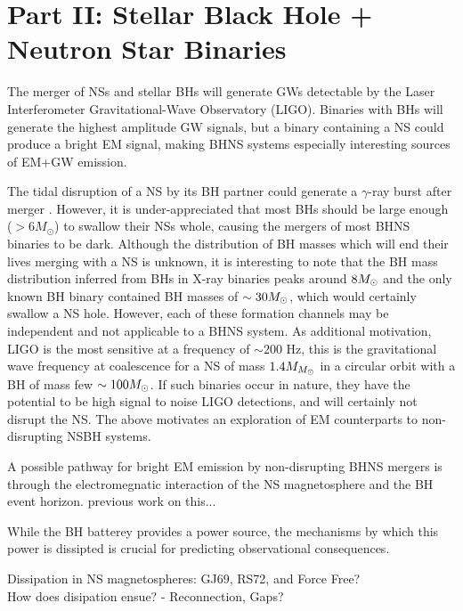 \section{Part II: Stellar Black Hole + Neutron Star Binaries}
%

The merger of NSs and stellar BHs will generate GWs detectable by the Laser
Interferometer Gravitational-Wave Observatory (LIGO). Binaries with BHs will
generate the highest amplitude GW signals, but a binary containing a NS could
produce a bright EM signal, making BHNS systems especially interesting sources
of EM+GW emission.

The tidal disruption of a NS by its BH partner could generate a $\gamma$-ray
burst after merger \citep{NPP:NSBH_GRB:1992}. However, it is under-appreciated
that most BHs should be large enough ($> 6M_\odot $) to swallow their NSs
whole, causing the mergers of most BHNS binaries to be dark. 
Although the distribution of BH masses
which will end their lives merging with a NS is unknown, it is interesting to
note that the BH mass distribution inferred from BHs in X-ray binaries peaks
around $8 {M_{\odot}}$ \citep{Orzel:2008} and the only known BH binary contained BH
masses of $\sim 30 {M_{\odot}}$, which would certainly swallow a NS hole. However,
each of these formation channels may be independent and not applicable to a
BHNS system. As additional motivation, LIGO is the most sensitive at a
frequency of $\sim 200$ Hz, this is the gravitational wave frequency at
coalescence for a NS of mass $1.4 M_{{M_{\odot}}}$ in a circular orbit with a BH of
mass few $\sim100 {M_{\odot}}$. If such binaries occur in nature, they have the
potential to be high signal to noise LIGO detections, and will certainly not
disrupt the NS. The above motivates an exploration of EM counterparts to non-
disrupting NSBH systems.


A possible pathway for bright EM emission by non-disrupting BHNS mergers is through the electromegnatic interaction of the NS magnetosphere and the BH event horizon. 
previous work on this...


While the BH batterey provides a power source, the mechanisms by which this power is dissipted is crucial for predicting observational consequences. 

Dissipation in NS magnetospheres:
GJ69, RS72, and Force Free?\\
How does disipation ensue? - Reconnection, Gaps?

